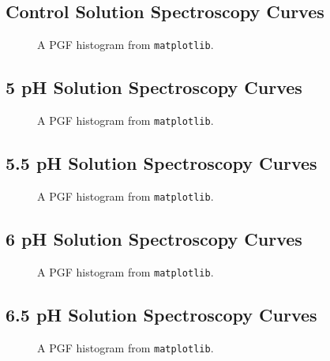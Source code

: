 \documentclass[a4paper]{article}
\begin{document}
\subsection*{Control Solution Spectroscopy Curves}
\begin{figure}[h]
    \begin{center}
        
    \end{center}
    \caption{A PGF histogram from \texttt{matplotlib}.}
\end{figure}
\newpage

\subsection*{5 pH Solution Spectroscopy Curves}
\begin{figure}[h]
    \begin{center}
        
    \end{center}
    \caption{A PGF histogram from \texttt{matplotlib}.}
\end{figure}
\newpage

\subsection*{5.5 pH Solution Spectroscopy Curves}
\begin{figure}[h]
    \begin{center}
        
    \end{center}
    \caption{A PGF histogram from \texttt{matplotlib}.}
\end{figure}
\newpage

\subsection*{6 pH Solution Spectroscopy Curves}
\begin{figure}[h]
    \begin{center}
        
    \end{center}
    \caption{A PGF histogram from \texttt{matplotlib}.}
\end{figure}
\newpage

\subsection*{6.5 pH Solution Spectroscopy Curves}
\begin{figure}[h]
    \begin{center}
        
    \end{center}
    \caption{A PGF histogram from \texttt{matplotlib}.}
\end{figure}
\newpage
\end{document}
